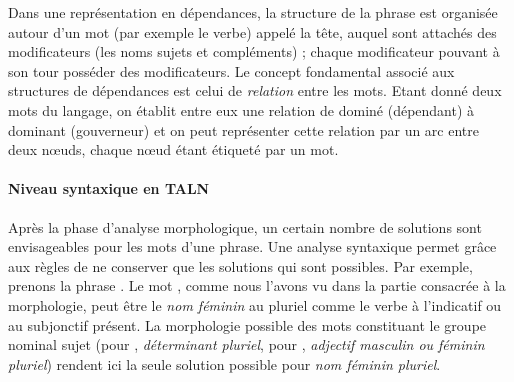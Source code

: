 Dans une représentation en dépendances, la structure de la phrase est organisée autour d'un mot (par exemple le verbe) appelé la tête, auquel sont attachés des modificateurs (les noms sujets et compléments) ; chaque modificateur pouvant à son tour posséder des modificateurs. Le concept fondamental associé aux structures de dépendances est celui de \emph{relation} entre les mots. Etant donné deux mots du langage, on établit entre eux une relation de dominé (dépendant) à dominant (gouverneur) et on peut représenter cette relation par un arc entre deux n\oe uds, chaque n\oe ud étant étiqueté par un mot.


\paragraph{Niveau syntaxique en
  TALN}\label{sec:niveau-syntaxique-en-TALN}

Après la phase d'analyse morphologique, un certain nombre de solutions
sont envisageables pour les mots d'une phrase. Une analyse syntaxique
permet grâce aux règles de ne conserver que les solutions qui sont
possibles. Par exemple, prenons la phrase . Le mot
, comme nous l'avons vu dans la partie consacrée à la
morphologie, peut être le \emph{nom féminin}  au
pluriel comme le verbe  à l'indicatif ou au
subjonctif présent. La morphologie possible des mots constituant le
groupe nominal sujet  (pour
, \emph{déterminant pluriel}, pour ,
\emph{adjectif masculin ou féminin pluriel}) rendent ici la seule
solution possible pour  \emph{nom féminin pluriel}.

